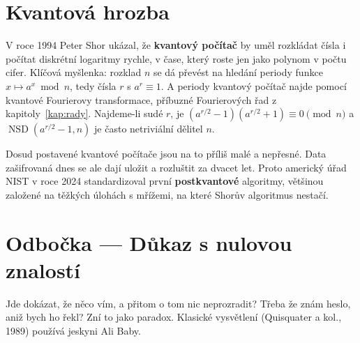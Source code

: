 \section{Kvantová hrozba}

V roce 1994 Peter Shor ukázal, že \textbf{kvantový počítač} by uměl rozkládat čísla i počítat diskrétní logaritmy rychle, v čase, který roste jen jako polynom v počtu cifer. Klíčová myšlenka: rozklad $n$ se dá převést na hledání periody funkce $x\mapsto a^x\bmod n$, tedy čísla $r$ s $a^r\equiv 1$. A periody kvantový počítač najde pomocí kvantové Fourierovy transformace, příbuzné Fourierových řad z kapitoly~\ref{kap:rady}. Najdeme-li sudé $r$, je $(a^{r/2} - 1)(a^{r/2} + 1)\equiv 0\pmod n$ a $\operatorname{NSD}(a^{r/2} - 1, n)$ je často netriviální dělitel $n$.

Dosud postavené kvantové počítače jsou na to příliš malé a nepřesné. Data zašifrovaná dnes se ale dají uložit a rozluštit za dvacet let. Proto americký úřad NIST v roce 2024 standardizoval první \textbf{postkvantové} algoritmy, většinou založené na těžkých úlohách s mřížemi, na které Shorův algoritmus nestačí.

\section{Odbočka --- Důkaz s nulovou znalostí}

Jde dokázat, že něco vím, a přitom o tom nic neprozradit? Třeba že znám heslo, aniž bych ho řekl? Zní to jako paradox. Klasické vysvětlení (Quisquater a kol., 1989) používá jeskyni Ali Baby.

\begin{center}
\end{center}

